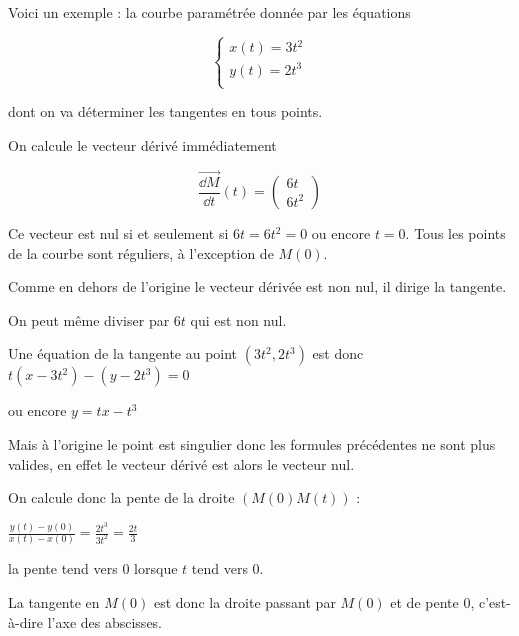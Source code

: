 \diapo

Voici un exemple : la courbe paramétrée donnée par les équations 

$$\left\{
\begin{array}{l}
x(t)=3t^2\\
y(t)=2t^3\\
\end{array}\right.$$

dont on va déterminer les tangentes en tous points.

\change

On calcule  le vecteur dérivé immédiatement 

\change

$$\overrightarrow{\frac{\dd M}{\dd t}}(t)=\left(\begin{smallmatrix}
6t\\6t^2\end{smallmatrix}\right)$$ 

Ce vecteur est nul si et seulement si $6t=6t^2=0$ ou encore $t=0$. Tous
les points de la courbe sont réguliers, à l'exception de $M(0)$. 

\change
\change

Comme en dehors de l'origine le vecteur dérivée est non nul, il
dirige la tangente.

\change
On peut même diviser par $6t$ qui est non nul.

\change
Une équation de la tangente au point $(3t^2,2t^3)$ est 
donc $t(x-3t^2)-(y-2t^3)=0$

\change
ou encore $y=tx-t^3$


\change
Mais à l'origine le point est singulier donc les formules
précédentes ne sont plus valides, en effet le vecteur dérivé 
est alors le vecteur nul.

\change
On calcule donc la pente de la droite $\left( M(0)M(t) \right)$ :

$\frac{y(t)-y(0)}{x(t)-x(0)}=\frac{2t^3}{3t^2}=\frac{2t}{3}$

la pente tend vers $0$ lorsque $t$ tend vers $0$.

\change
La tangente en $M(0)$ est donc la droite passant par 
$M(0)$ et de pente $0$, c'est-à-dire l'axe des abscisses.




\diapo

